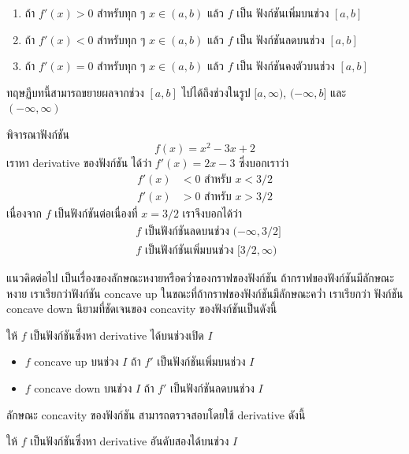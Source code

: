 \documentclass[
]{book}
\begin{document}
\begin{enumerate}
\def\labelenumi{\arabic{enumi}.}
\item
  ถ้า \(f'(x) > 0\) สำหรับทุก ๆ \(x \in (a,b)\) แล้ว \(f\) เป็น ฟังก์ชันเพิ่มบนช่วง
  \([a,b]\)
\item
  ถ้า \(f'(x) < 0\) สำหรับทุก ๆ \(x \in (a,b)\) แล้ว \(f\) เป็น ฟังก์ชันลดบนช่วง
  \([a,b]\)
\item
  ถ้า \(f'(x) = 0\) สำหรับทุก ๆ \(x \in (a,b)\) แล้ว \(f\) เป็น
  ฟังก์ชันคงตัวบนช่วง \([a,b]\)
\end{enumerate}

ทฤษฏีบทนี้สามารถขยายผลจากช่วง \([a,b]\) ไปได้ถึงช่วงในรูป \([a,\infty)\),
\((-\infty,b]\) และ \((-\infty,\infty)\)

พิจารณาฟังก์ชัน \[f(x) = x^2-3x+2\] เราหา derivative ของฟังก์ชัน ได้ว่า
\(f'(x) = 2x-3\) ซึ่งบอกเราว่า \begin{equation}   \begin{aligned}
    f'(x) &< 0 \text{ สำหรับ $x < 3/2$} \\
    f'(x) &> 0 \text{ สำหรับ $x > 3/2$}
  \end{aligned} \end{equation} เนื่องจาก \(f\) เป็นฟังก์ชันต่อเนื่องที่ \(x=3/2\)
เราจึงบอกได้ว่า \begin{equation}   \begin{aligned}
    \text{ $f$ เป็นฟังก์ชันลดบนช่วง $(-\infty,3/2]$} \\
    \text{ $f$ เป็นฟังก์ชันเพิ่มบนช่วง $[3/2,\infty)$}
  \end{aligned} \end{equation}

แนวคิดต่อไป เป็นเรื่องของลักษณะหงายหรือคว่ำของกราฟของฟังก์ชัน
ถ้ากราฟของฟังก์ชันมีลักษณะหงาย เราเรียกว่าฟังก์ชัน concave up
ในขณะที่ถ้ากราฟของฟังก์ชันมีลักษณะคว่ำ เราเรียกว่า ฟังก์ชัน concave down นิยามที่ชัดเจนของ
concavity ของฟังก์ชันเป็นดังนี้

ให้ \(f\) เป็นฟังก์ชันซึ่งหา derivative ได้บนช่วงเปิด \(I\)

\begin{itemize}
\item
  \(f\) concave up บนช่วง \(I\) ถ้า \(f'\) เป็นฟังก์ชันเพิ่มบนช่วง \(I\)
\item
  \(f\) concave down บนช่วง \(I\) ถ้า \(f'\) เป็นฟังก์ชันลดบนช่วง \(I\)
\end{itemize}

ลักษณะ concavity ของฟังก์ชัน สามารถตรวจสอบโดยใช้ derivative ดังนี้

ให้ \(f\) เป็นฟังก์ชันซึ่งหา derivative อันดับสองได้บนช่วง \(I\)
\end{document}
